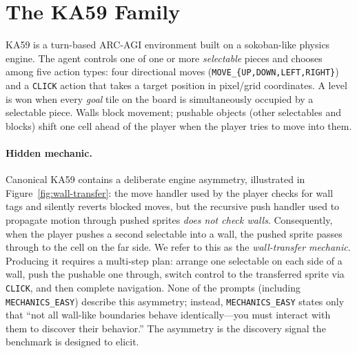 \documentclass{article}
\begin{document}
\section{The KA59 Family}
\label{sec:ka59}
KA59 is a turn-based ARC-AGI environment built on a sokoban-like physics engine. The agent controls one of one or more \emph{selectable} pieces and chooses among five action types: four directional moves (\texttt{MOVE\_\{UP,DOWN,LEFT,RIGHT\}}) and a \texttt{CLICK} action that takes a target position in pixel/grid coordinates. A level is won when every \emph{goal} tile on the board is simultaneously occupied by a selectable piece. Walls block movement; pushable objects (other selectables and blocks) shift one cell ahead of the player when the player tries to move into them.

\paragraph{Hidden mechanic.}
Canonical KA59 contains a deliberate engine asymmetry, illustrated in Figure~\ref{fig:wall-transfer}: the move handler used by the player checks for wall tags and silently reverts blocked moves, but the recursive push handler used to propagate motion through pushed sprites \emph{does not check walls}. Consequently, when the player pushes a second selectable into a wall, the pushed sprite passes through to the cell on the far side. We refer to this as the \emph{wall-transfer mechanic}. Producing it requires a multi-step plan: arrange one selectable on each side of a wall, push the pushable one through, switch control to the transferred sprite via \texttt{CLICK}, and then complete navigation. None of the prompts (including \texttt{MECHANICS\_EASY}) describe this asymmetry; instead, \texttt{MECHANICS\_EASY} states only that ``not all wall-like boundaries behave identically---you must interact with them to discover their behavior.'' The asymmetry is the discovery signal the benchmark is designed to elicit.
\end{document}

